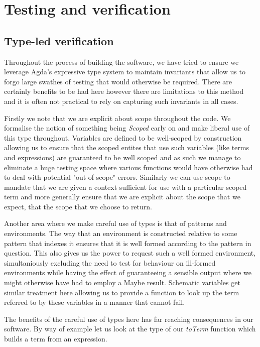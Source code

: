 \chapter{Testing and verification}
\label{chapter-testing}
\section{Type-led verification}

Throughout the process of building the software, we have tried to
ensure we leverage Agda's expressive type system to maintain
invariants that allow us to forgo large swathes of testing that would
otherwise be required. There are certainly benefits to be had here
however there are limitations to this method and it is often not
practical to rely on capturing such invariants in all cases.

Firstly we note that we are explicit about scope throughout the
code. We formalise the notion of something being \emph{Scoped} early
on and make liberal use of this type throughout. Variables are defined
to be well-scoped by construction allowing 
us to ensure that the scoped entites that use such variables (like
terms and expressions) are guaranteed to be well scoped and as such we
manage to eliminate a huge testing space where various functions would
have otherwise had to deal with potential "out of scope"
errors. Similarly we can use scope to mandate that we are given a
context sufficient for use with a particular scoped term and more
generally ensure that we are explicit about the scope that we expect,
that the scope that we choose to return.

Another area where we make careful use of types is that of patterns
and environments. The way that an environment is
constructed relative to some pattern that indexes it ensures that it
is well formed according to the pattern in question. This also gives
us the power to request such a well formed environment, simultaniously
excluding the need to test for behaviour on ill-formed environments
while having the effect of guaranteeing a sensible output where we
might otherwise have had to employ a Maybe result. Schematic variables
get similar treatment here allowing us to provide a function to look
up the term referred to by these variables in a manner that cannot
fail. 

The benefits of the careful use of types here has far reaching
consequences in our software. By way of example let us look at the
type of our \emph{toTerm} function which builds a term from an expression.

